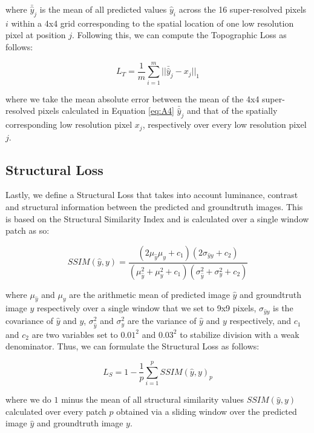 \documentclass[tc, manuscript]{copernicus}
\begin{document}
where $\bar{\hat{y}}_j$ is the mean of all predicted values $\hat{y}_i$ across the 16 super-resolved pixels $i$ within a 4x4 grid corresponding to the spatial location of one low resolution pixel at position $j$.
Following this, we can compute the Topographic Loss as follows:

\begin{equation}\label{eq:A5}
  L_T = \dfrac{1}{m} \sum\limits_{i=1}^m ||\bar{\hat{y}}_j - x_j||_{1}
\end{equation}

where we take the mean absolute error between the mean of the 4x4 super-resolved pixels calculated in Equation \eqref{eq:A4} $\bar{\hat{y}}_j$ and that of the spatially corresponding low resolution pixel $x_j$, respectively over every low resolution pixel $j$.

\subsection{Structural Loss}

Lastly, we define a Structural Loss that takes into account luminance, contrast and structural information between the predicted and groundtruth images.
This is based on the Structural Similarity Index \citep[SSIM,][]{WangImageQualityAssessment2004} and is calculated over a single window patch as so:

\begin{equation}\label{eq:A6}
  SSIM(\hat{y}, y) = \dfrac{(2\mu_{\hat{y}}\mu_y + c_1)(2\sigma_{{\hat{y}}y} + c_2)}{(\mu_{\hat{y}}^2 + \mu_y^2 + c_1)(\sigma_{\hat{y}}^2 + \sigma_y^2 + c_2)}
\end{equation}

where $\mu_{\hat{y}}$ and $\mu_y$ are the arithmetic mean of predicted image ${\hat{y}}$ and groundtruth image $y$ respectively over a single window that we set to 9x9 pixels, $\sigma_{{\hat{y}}y}$ is the covariance of ${\hat{y}}$ and $y$, $\sigma_{\hat{y}}^2$ and $\sigma_y^2$ are the variance of ${\hat{y}}$ and $y$ respectively, and $c_1$ and $c_2$ are two variables set to $0.01^2$ and $0.03^2$ to stabilize division with a weak denominator.
Thus, we can formulate the Structural Loss as follows:

\begin{equation}\label{eq:A7}
  L_S = 1 - \dfrac{1}{p} \sum\limits_{i=1}^p SSIM(\hat{y}, y)_p
\end{equation}

where we do $1$ minus the mean of all structural similarity values $SSIM(\hat{y}, y)$ calculated over every patch $p$ obtained via a sliding window over the predicted image ${\hat{y}}$ and groundtruth image $y$.
\end{document}

